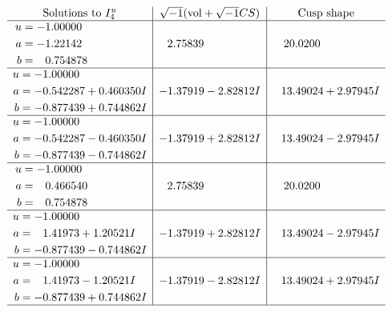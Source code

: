 \documentclass[1p]{elsarticle_modified}
\theoremstyle{definition}
\newcommand{\I}{\sqrt{-1}}
\begin{document}
$$\begin{array}{c|c|c}  
\text{Solutions to }I^u_{4}& \I (\text{vol} + \sqrt{-1}CS) & \text{Cusp shape}\\
 \hline 
\begin{aligned}
u &= -1.00000\phantom{ +0.000000I} \\
a &= -1.22142\phantom{ +0.000000I} \\
b &= \phantom{-}0.754878\phantom{ +0.000000I}\end{aligned}
 & \phantom{-}2.75839\phantom{ +0.000000I} & \phantom{-}20.0200\phantom{ +0.000000I} \\ \hline\begin{aligned}
u &= -1.00000\phantom{ +0.000000I} \\
a &= -0.542287 + 0.460350 I \\
b &= -0.877439 + 0.744862 I\end{aligned}
 & -1.37919 - 2.82812 I & \phantom{-}13.49024 + 2.97945 I \\ \hline\begin{aligned}
u &= -1.00000\phantom{ +0.000000I} \\
a &= -0.542287 - 0.460350 I \\
b &= -0.877439 - 0.744862 I\end{aligned}
 & -1.37919 + 2.82812 I & \phantom{-}13.49024 - 2.97945 I \\ \hline\begin{aligned}
u &= -1.00000\phantom{ +0.000000I} \\
a &= \phantom{-}0.466540\phantom{ +0.000000I} \\
b &= \phantom{-}0.754878\phantom{ +0.000000I}\end{aligned}
 & \phantom{-}2.75839\phantom{ +0.000000I} & \phantom{-}20.0200\phantom{ +0.000000I} \\ \hline\begin{aligned}
u &= -1.00000\phantom{ +0.000000I} \\
a &= \phantom{-}1.41973 + 1.20521 I \\
b &= -0.877439 - 0.744862 I\end{aligned}
 & -1.37919 + 2.82812 I & \phantom{-}13.49024 - 2.97945 I \\ \hline\begin{aligned}
u &= -1.00000\phantom{ +0.000000I} \\
a &= \phantom{-}1.41973 - 1.20521 I \\
b &= -0.877439 + 0.744862 I\end{aligned}
 & -1.37919 - 2.82812 I & \phantom{-}13.49024 + 2.97945 I\\
 \hline 
 \end{array}$$\newpage\newpage\renewcommand{\arraystretch}{1}
\end{document}
